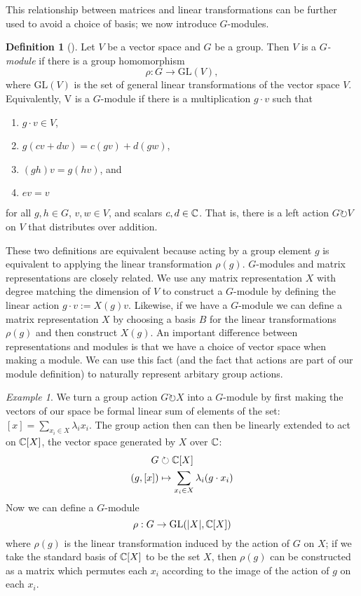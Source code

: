 \documentclass[11 pt]{amsart}
\theoremstyle{plain}   %
\theoremstyle{definition}
\newtheorem{defn}{Definition}[section]
\theoremstyle{remark}
\newtheorem{ex}{Example}[section]
\numberwithin{equation}{section}
\def\GL{\mathrm{GL}} \def\SL{\mathrm{SL}}  \def\SP{\mathrm{SL}}\def\OG{\mathrm{O}}
\def\acts{\circlearrowright} %
\begin{document}
  This relationship between matrices and linear transformations can be further used to avoid a choice of basis; we now introduce
  $G$-modules.
  \begin{defn}[{\cite[Definition 1.3.1]{sagan}}]
    Let $V$ be a vector space and $G$ be a group. Then $V$ is a \emph{$G$-module} if there is a group homomorphism
    \[\rho: G \to \GL(V),\]
    where $\GL(V)$ is the set of general linear transformations of the vector space $V$.
    Equivalently, V is a $G$-module if there is a multiplication $g \cdot v$ such that
    \begin{enumerate}
    \item $g \cdot v \in V$,
    \item $g(cv + dw) = c(gv) + d(gw)$,
    \item $(gh)v = g(hv)$, and
    \item $ev = v$
    \end{enumerate}
    for all $g,h \in G$, $v,w \in V$, and scalars $c,d \in \mathbb{C}$.
    That is, there is a left action $G \acts V$ on $V$ that distributes over addition.
  \end{defn}
  These two definitions are equivalent because acting by a group element $g$ is equivalent to applying the linear transformation $\rho(g)$.
  $G$-modules and matrix representations are closely related. We use any matrix representation $X$ with degree matching the dimension of $V$
  to construct a $G$-module by defining the linear action $g \cdot v := X(g) v$. Likewise, if we have a $G$-module we can define
  a matrix representation $X$ by choosing a basis $B$ for the linear transformations $\rho(g)$ and then construct $X(g)$.
  An important difference between representations and modules is that we have a choice of vector space when making a module.
  We can use this fact (and the fact that actions are part of our module definition) to naturally represent arbitary group actions.
  \begin{ex} We turn a group action $G \acts X$ into a $G$-module by first making the vectors of our space be
    formal linear sum of elements of the set: $[x] = \sum_{x_i \in X} \lambda_i x_i$.
    The group action then can then be linearly extended to act on $\mathbb{C}[X]$, the vector space generated by $X$ over $\mathbb{C}$:
    \begin{align*}
      G &\acts \CC [X] \\
      (g,[x]) &\mapsto \sum_{x_i \in X} \lambda_i (g \cdot x_i)
    \end{align*}
    Now we can define a $G$-module
    \[ \rho: G \to \GL(|X|, \CC [X])\]
    where $\rho(g)$ is the linear transformation induced by the action of $G$ on $X$; if we take the standard basis of $\mathbb{C} [X]$ to be
    the set $X$, then $\rho(g)$ can be constructed as a matrix which permutes each $x_i$ according to the image of the action of $g$ on each $x_i$.
  \end{ex}
\end{document}
